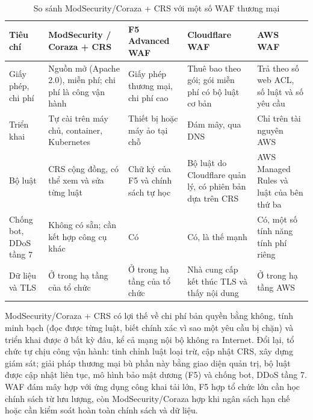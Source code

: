 \begin{table}[!htb]
\centering
\caption{So sánh ModSecurity/Coraza + CRS với một số WAF thương mại}
\label{tab:sosanh}
\footnotesize
\renewcommand{\arraystretch}{1.12}
\begin{tabularx}{\linewidth}{@{}>{\raggedright\arraybackslash}p{2.0cm}*{4}{>{\raggedright\arraybackslash}X}@{}}
\toprule
\textbf{Tiêu chí} & \textbf{ModSecurity / Coraza + CRS} & \textbf{F5 Advanced WAF} & \textbf{Cloudflare WAF} & \textbf{AWS WAF} \\ \midrule
Giấy phép, chi phí & Nguồn mở (Apache 2.0), miễn phí; chi phí là công vận hành & Giấy phép thương mại, chi phí cao & Thuê bao theo gói; gói miễn phí có bộ luật cơ bản & Trả theo số web ACL, số luật và số yêu cầu \\
Triển khai & Tự cài trên máy chủ, container, Kubernetes & Thiết bị hoặc máy ảo tại chỗ & Đám mây, qua DNS & Chỉ trên tài nguyên AWS \\
Bộ luật & CRS cộng đồng, có thể xem và sửa từng luật & Chữ ký của F5 và chính sách tự học & Bộ luật do Cloudflare quản lý, có phiên bản dựa trên CRS & AWS Managed Rules và luật của bên thứ ba \\
Chống bot, DDoS tầng 7 & Không có sẵn; cần kết hợp công cụ khác & Có & Có, là thế mạnh & Có, một số tính năng tính phí riêng \\
Dữ liệu và TLS & Ở trong hạ tầng của tổ chức & Ở trong hạ tầng của tổ chức & Nhà cung cấp kết thúc TLS và thấy nội dung & Ở trong hạ tầng AWS \\
\bottomrule
\end{tabularx}
\end{table}

ModSecurity/Coraza + CRS có lợi thế về chi phí bản quyền bằng không, tính minh bạch (đọc được từng luật, biết chính xác vì sao một yêu cầu bị chặn) và triển khai được ở bất kỳ đâu, kể cả mạng nội bộ không ra Internet. Đổi lại, tổ chức tự chịu công vận hành: tinh chỉnh luật loại trừ, cập nhật CRS, xây dựng giám sát; giải pháp thương mại bù phần này bằng giao diện quản trị, bộ luật được cập nhật liên tục, mô hình bảo mật dương (F5) và chống bot, DDoS tầng 7. WAF đám mây hợp với ứng dụng công khai tải lớn, F5 hợp tổ chức lớn cần học chính sách từ lưu lượng, còn ModSecurity/Coraza hợp khi ngân sách hạn chế hoặc cần kiểm soát hoàn toàn chính sách và dữ liệu.
